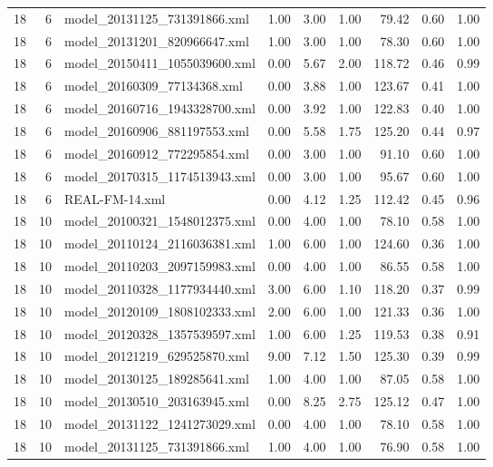 \begin{table}[ht]
\begin{tabular}{rrlrrrrrr}
   18 &   6 & model\_20131125\_731391866.xml & 1.00 & 3.00 & 1.00 & 79.42 & 0.60 & 1.00 \\ 
   18 &   6 & model\_20131201\_820966647.xml & 1.00 & 3.00 & 1.00 & 78.30 & 0.60 & 1.00 \\ 
   18 &   6 & model\_20150411\_1055039600.xml & 0.00 & 5.67 & 2.00 & 118.72 & 0.46 & 0.99 \\ 
   18 &   6 & model\_20160309\_77134368.xml & 0.00 & 3.88 & 1.00 & 123.67 & 0.41 & 1.00 \\ 
   18 &   6 & model\_20160716\_1943328700.xml & 0.00 & 3.92 & 1.00 & 122.83 & 0.40 & 1.00 \\ 
   18 &   6 & model\_20160906\_881197553.xml & 0.00 & 5.58 & 1.75 & 125.20 & 0.44 & 0.97 \\ 
   18 &   6 & model\_20160912\_772295854.xml & 0.00 & 3.00 & 1.00 & 91.10 & 0.60 & 1.00 \\ 
   18 &   6 & model\_20170315\_1174513943.xml & 0.00 & 3.00 & 1.00 & 95.67 & 0.60 & 1.00 \\ 
   18 &   6 & REAL-FM-14.xml & 0.00 & 4.12 & 1.25 & 112.42 & 0.45 & 0.96 \\ 
   18 &  10 & model\_20100321\_1548012375.xml & 0.00 & 4.00 & 1.00 & 78.10 & 0.58 & 1.00 \\ 
   18 &  10 & model\_20110124\_2116036381.xml & 1.00 & 6.00 & 1.00 & 124.60 & 0.36 & 1.00 \\ 
   18 &  10 & model\_20110203\_2097159983.xml & 0.00 & 4.00 & 1.00 & 86.55 & 0.58 & 1.00 \\ 
   18 &  10 & model\_20110328\_1177934440.xml & 3.00 & 6.00 & 1.10 & 118.20 & 0.37 & 0.99 \\ 
   18 &  10 & model\_20120109\_1808102333.xml & 2.00 & 6.00 & 1.00 & 121.33 & 0.36 & 1.00 \\ 
   18 &  10 & model\_20120328\_1357539597.xml & 1.00 & 6.00 & 1.25 & 119.53 & 0.38 & 0.91 \\ 
   18 &  10 & model\_20121219\_629525870.xml & 9.00 & 7.12 & 1.50 & 125.30 & 0.39 & 0.99 \\ 
   18 &  10 & model\_20130125\_189285641.xml & 1.00 & 4.00 & 1.00 & 87.05 & 0.58 & 1.00 \\ 
   18 &  10 & model\_20130510\_203163945.xml & 0.00 & 8.25 & 2.75 & 125.12 & 0.47 & 1.00 \\ 
   18 &  10 & model\_20131122\_1241273029.xml & 0.00 & 4.00 & 1.00 & 78.10 & 0.58 & 1.00 \\ 
   18 &  10 & model\_20131125\_731391866.xml & 1.00 & 4.00 & 1.00 & 76.90 & 0.58 & 1.00 \\ 

\end{tabular}
\end{table}
